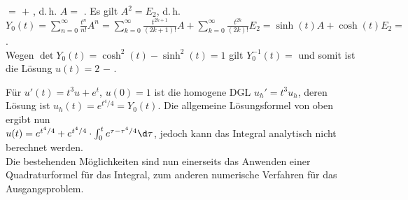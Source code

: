 \begin{Bsp}
    $=$
    $+$
    , d.\,h.
    $A =$
    .
    Es gilt $A^2 = E_2$, d.\,h.\\
    $Y_0(t) = \sum_{n=0}^\infty \frac{t^n}{n!} A^n =
    \sum_{k=0}^\infty \frac{t^{2k+1}}{(2k+1)!} A +
    \sum_{k=0}^\infty \frac{t^{2k}}{(2k)!} E_2 =
    \sinh(t) A + \cosh(t) E_2 =$
    .\\
    Wegen $\det Y_0(t) = \cosh^2(t) - \sinh^2(t) = 1$ gilt
    $Y_0^{-1}(t) =$
    und somit ist die Lösung
    $u(t) = 2$
    $-$
    .
\end{Bsp}

\begin{Bsp}
    Für $u'(t) = t^3 u + e^t$, $u(0) = 1$ ist die homogene DGL
    $u_h' = t^3 u_h$, deren Lösung ist $u_h(t) = e^{t^4/4} = Y_0(t)$.
    Die allgemeine Lösungsformel von oben ergibt nun\\
    $u(t) = e^{t^4/4} +
    e^{t^4/4} \cdot \int_0^t e^{\tau - \tau^4/4} \d\tau$,
    jedoch kann das Integral analytisch nicht berechnet werden.\\
    Die bestehenden Möglichkeiten sind nun einerseits das Anwenden einer
    Quadraturformel für das Integral, zum anderen numerische Verfahren für
    das Ausgangsproblem.
\end{Bsp}

